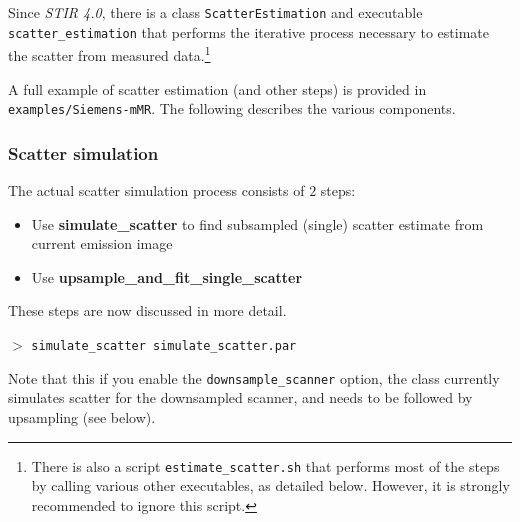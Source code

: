\documentclass{article}
\newcommand{\cmdline}[1]{\par \noindent $>$ \texttt{#1}\par}
\begin{document}
Since \textit{STIR 4.0}, there is a class \texttt{ScatterEstimation} and executable
\texttt{scatter\_estimation} that performs the iterative process necessary to estimate
the scatter from measured data.\footnote{%
There is also a script \texttt{estimate\_scatter.sh} that performs most of the steps by
calling various other executables, as detailed below. However, it is strongly recommended to
ignore this script.}

A full example of scatter estimation (and other steps) is provided in \texttt{examples/Siemens-mMR}.
The following describes the various components.

\subsubsection{Scatter simulation}
The actual scatter simulation process consists of $2$ steps:
\begin{itemize} 
\item Use \textbf{simulate\_scatter} to find subsampled (single) scatter estimate from current emission image
\item Use \textbf{upsample\_and\_fit\_single\_scatter}
\end{itemize} 
These steps are now discussed in more detail.\\[1cm]

\cmdline{simulate\_scatter simulate\_scatter.par}
Note that this if you enable the \texttt{downsample\_scanner} option, the class currently simulates
scatter for the downsampled scanner, and needs to be followed by upsampling (see below).
\end{document}
